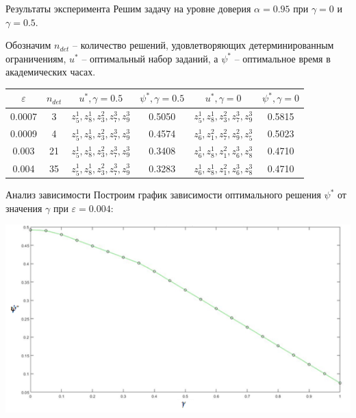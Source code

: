 \documentclass[aspectratio=169]{beamer}
\begin{document}
    \begin{frame}{Результаты эксперимента}
        Решим задачу на уровне доверия $\alpha=0.95$ при $\gamma=0$ и $\gamma=0.5$.\newline
        
        Обозначим $n_{det}$ -- количество решений, удовлетворяющих детерминированным ограничениям, $u^*$ -- оптимальный набор заданий, а $\psi^*$ -- оптимальное время в академических часах.
       	
       	\begin{table}[]
\begin{tabular}{|c|c|c|c|c|c|}
\hline
$\varepsilon$ & $n_{det}$ & $u^*,\gamma=0.5$ & $\psi^*,\gamma=0.5$ & $u^*,\gamma=0$ & $\psi^*,\gamma=0$ \\ \hline
0.0007 & 3 & $z_5^1,z_8^1,z_3^2,z_7^3,z_9^3$ & 0.5050 & $z_5^1,z_8^1,z_3^2,z_7^3,z_9^3$ & 0.5815 \\ \hline
0.0009 & 4 & $z_5^1,z_8^1,z_3^2,z_7^3,z_9^3$ & 0.4574 & $z_6^1,z_1^2,z_7^2,z_9^2,z_5^3$ & 0.5023 \\ \hline
0.003 & 21 & $z_5^1,z_8^1,z_3^2,z_7^3,z_9^3$ & 0.3408 & $z_6^1,z_8^1,z_1^2,z_6^3,z_8^3$ & 0.4710 \\ \hline
0.004 & 35 & $z_5^1,z_8^1,z_3^2,z_7^3,z_9^3$ & 0.3283 & $z_6^1,z_8^1,z_1^2,z_6^3,z_8^3$ & 0.4710 \\ \hline
\end{tabular}
\end{table}
    \end{frame}
    
    \begin{frame}{Анализ зависимости}
        Построим график зависимости оптимального решения $\psi^*$ от значения $\gamma$ при $\varepsilon=0.004$:
        
        \begin{center}
        \includegraphics[scale=0.6]{plot}
        \end{center}
    \end{frame}
    
\end{document}
